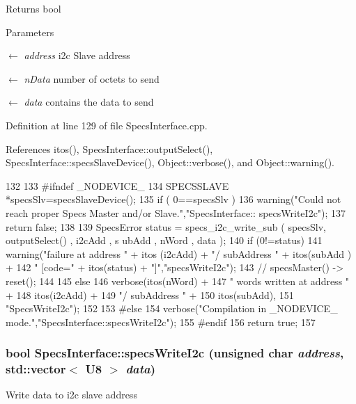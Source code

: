 \begin{DoxyReturn}{Returns}
bool 
\end{DoxyReturn}

\begin{DoxyParams}{Parameters}
\item[\mbox{$\leftarrow$} {\em address}]i2c Slave address \item[\mbox{$\leftarrow$} {\em nData}]number of octets to send \item[\mbox{$\leftarrow$} {\em data}]contains the data to send \end{DoxyParams}


Definition at line 129 of file SpecsInterface.cpp.

References itos(), SpecsInterface::outputSelect(), SpecsInterface::specsSlaveDevice(), Object::verbose(), and Object::warning().


\begin{DoxyCode}
132                                             {
133 #ifndef _NODEVICE_
134   SPECSSLAVE *specsSlv=specsSlaveDevice();
135   if ( 0==specsSlv ){
136     warning("Could not reach proper Specs Master and/or Slave.","SpecsInterface::
      specsWriteI2c");
137     return false;
138   }
139   SpecsError status = specs_i2c_write_sub ( specsSlv, outputSelect() , i2cAdd , s
      ubAdd , nWord , data );
140   if (0!=status){
141     warning("failure at address " + itos (i2cAdd) + "/ subAddress " + itos(subAdd
      ) +
142             " [code=" + itos(status) + "]","specsWriteI2c");
143     //    specsMaster() -> reset();
144   }
145   else {
146     verbose(itos(nWord) + 
147             " words written at address " + 
148             itos(i2cAdd) + 
149             "/ subAddress " + 
150             itos(subAdd),
151             "SpecsWriteI2c");
152   }
153 #else
154   verbose("Compilation in _NODEVICE_ mode.","SpecsInterface::specsWriteI2c");
155 #endif
156   return true;
157 }
\end{DoxyCode}
\hypertarget{classSpecsInterface_a00c49357f1f60e3e50de9a51fa127b79}{
\subsubsection[{specsWriteI2c}]{\setlength{\rightskip}{0pt plus 5cm}bool SpecsInterface::specsWriteI2c (unsigned char {\em address}, \/  std::vector$<$ {\bf U8} $>$ {\em data})}}
\label{classSpecsInterface_a00c49357f1f60e3e50de9a51fa127b79}
Write data to i2c slave address

